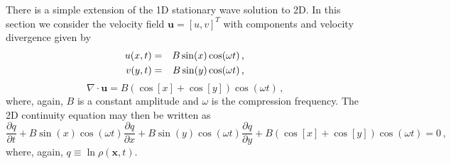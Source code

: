 \documentclass[11pt]{book}
\begin{document}
There is a simple extension of the 1D stationary wave solution to 2D. In this section we consider the velocity field $\mathbf{u}=[u,v]^T$ with components and velocity divergence given by
\begin{eqnarray}
\label{eqn_u2d}
u(x,t) &=& B \sin(x) \cos(\omega t) \,\mbox{,} \vspace{0.2cm}\\
v(y,t) &=& B \sin(y) \cos(\omega t) \,\mbox{,}
\end{eqnarray}
\begin{equation}
\label{eqn_div2d}
\nabla\cdot\mathbf{u} = B(\cos[x] + \cos[y]) \cos(\omega t) \,\mbox{,}
\end{equation}
where, again, $B$ is a constant amplitude and $\omega$ is the compression frequency.  The 2D continuity equation may then be written as
\begin{equation}
\label{eqn_cont2d}
\frac{\partial q}{\partial t} + B \sin(x) \cos(\omega t) \frac{\partial q}{\partial x} + B \sin(y) \cos(\omega t) \frac{\partial q}{\partial y} + B( \cos[x] + \cos[y]) \cos(\omega t) = 0 \,\mbox{,}
\end{equation}
where, again, $q \equiv \ln \rho(\mathbf{x},t)$.
\end{document}
